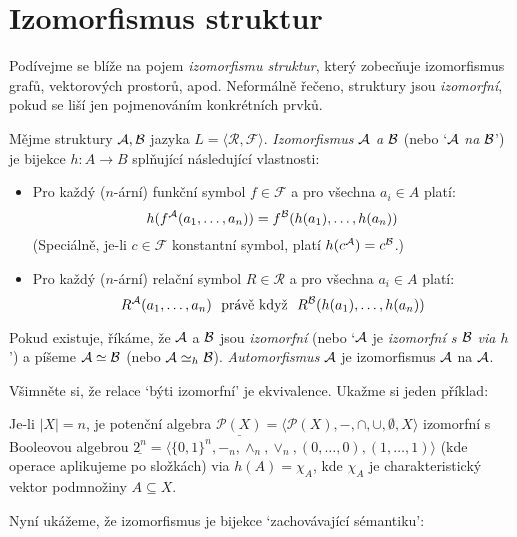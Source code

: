 \section{Izomorfismus struktur}\label{section:isomorphism-of-structures}

Podívejme se blíže na pojem \emph{izomorfismu struktur}, který zobecňuje izomorfismus grafů, vektorových prostorů, apod. Neformálně řečeno, struktury jsou \emph{izomorfní}, pokud se liší jen pojmenováním konkrétních prvků.

\begin{definition}
Mějme struktury $\mathcal{A},\mathcal{B}$ jazyka $L=\langle\mathcal R,\mathcal F\rangle$. \emph{Izomorfismus $\mathcal{A}$ a $\mathcal{B}$} (nebo `$\mathcal{A}$ \emph{na} $\mathcal{B}$') je bijekce $h\colon A\to B$ splňující následující vlastnosti:
\begin{itemize}
    \item Pro každý ($n$-ární) funkční symbol $f\in\mathcal F$ a pro všechna $a_i\in A$ platí:
    $$
    h(f^{\mathcal{A}}(a_1,\dots,a_n))=f^{\mathcal{B}}(h(a_1),\dots,h(a_n))
    $$
    (Speciálně, je-li $c\in\mathcal F$ konstantní symbol, platí $h(c^{\mathcal{A}})=c^{\mathcal{B}}$.)
    \item Pro každý ($n$-ární) relační symbol $R\in\mathcal R$ a pro všechna $a_i\in A$ platí:
    $$
    R^{\mathcal{A}}(a_1,\dots,a_n)\ \text{ právě když }\ R^{\mathcal{B}}(h(a_1),\dots,h(a_n))
    $$
\end{itemize}
Pokud existuje, říkáme, že $\mathcal{A}$ a $\mathcal{B}$ jsou \emph{izomorfní} (nebo `$\mathcal{A}$ je \emph{izomorfní s $\mathcal{B}$ via $h$}') a píšeme $\mathcal{A}\simeq\mathcal{B}$ (nebo $\mathcal{A}\simeq_h\mathcal{B}$). \emph{Automorfismus} $\mathcal{A}$ je izomorfismus $\mathcal{A}$ na $\mathcal{A}$.
\end{definition}

Všimněte si, že relace `býti izomorfní' je ekvivalence. Ukažme si jeden příklad:

\begin{example}
    Je-li $|X|=n$, je potenční algebra $\underline{\mathcal P(X)}=\langle \mathcal P(X),-,\cap,\cup,\emptyset,X\rangle$ izomorfní s Booleovou algebrou  $\underline{2^n}=\langle \{0,1\}^n,-_n,\land_n,\lor_n,(0,\dots,0),(1,\dots,1)\rangle$ (kde operace aplikujeme po složkách) via $h(A)=\chi_A$, kde $\chi_A$ je charakteristický vektor podmnožiny $A\subseteq X$.
\end{example}

Nyní ukážeme, že izomorfismus je bijekce `zachovávající sémantiku':

